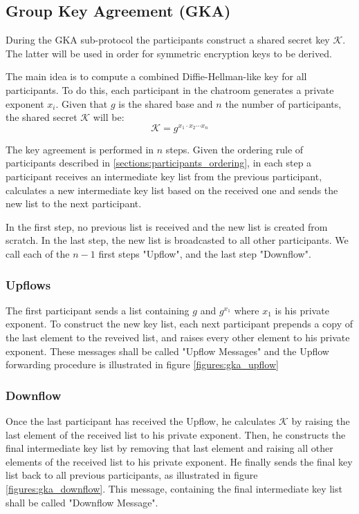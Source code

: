 \clearpage
\subsection{Group Key Agreement (GKA)}
\label{subsections:gka}

During the GKA sub-protocol the participants construct a shared secret key $\mathcal{K}$. The latter will be used in order for symmetric encryption keys to be derived.

The main idea is to compute a combined Diffie-Hellman-like key for all participants. To do this, each participant in the chatroom generates a private exponent $x_i$. Given that $g$ is the shared base and $n$ the number of participants, the shared secret $\mathcal{K}$ will be: 
\[
\mathcal{K} = g^{x_1 \cdot x_2 \cdots x_n}
\]

The key agreement is performed in $n$ steps. Given the ordering rule of participants described in \ref{sections:participants_ordering}, in each step a participant receives an intermediate key list from the previous participant, calculates a new intermediate key list based on the received one and sends the new list to the next participant.

In the first step, no previous list is received and the new list is created from scratch. In the last step, the new list is broadcasted to all other participants. We call each of the $n-1$ first steps "Upflow", and the last step "Downflow".

\subsubsection{Upflows}
The first participant sends a list containing $g$ and $g^{x_1}$ where $x_1$ is his private exponent. To construct the new key list, each next participant prepends a copy of the last element to the reveived list, and raises every other element to his private exponent. These messages shall be called "Upflow Messages" and the Upflow forwarding procedure is illustrated in figure \ref{figures:gka_upflow}
 
\subsubsection{Downflow}
Once the last participant has received the Upflow, he calculates $\mathcal{K}$ by raising the last element of the received list to his private exponent. Then, he constructs the final intermediate key list by removing that last element and raising all other elements of the received list to his private exponent. He finally sends the final key list back to all previous participants, as illustrated in figure \ref{figures:gka_downflow}. This message, containing the final intermediate key list shall be called "Downflow Message".

